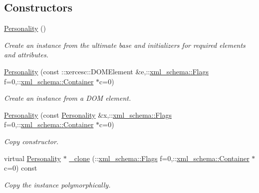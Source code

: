 \subsection*{Constructors}
\begin{DoxyCompactItemize}
\item 
\hypertarget{classopenstack_1_1xml_1_1Personality_af13149098f2110547580283711f33851}{
\hyperlink{classopenstack_1_1xml_1_1Personality_af13149098f2110547580283711f33851}{Personality} ()}
\label{classopenstack_1_1xml_1_1Personality_af13149098f2110547580283711f33851}

\begin{DoxyCompactList}\small\item\em Create an instance from the ultimate base and initializers for required elements and attributes. \item\end{DoxyCompactList}\item 
\hyperlink{classopenstack_1_1xml_1_1Personality_a3d4e14aac1922700707ac9179e1499ef}{Personality} (const ::xercesc::DOMElement \&e,::\hyperlink{namespacexml__schema_affb4c227cbd9aa7453dd1dc5a1401943}{xml\_\-schema::Flags} f=0,::\hyperlink{namespacexml__schema_a333dea2213742aea47a37532dec4ec27}{xml\_\-schema::Container} $\ast$c=0)
\begin{DoxyCompactList}\small\item\em Create an instance from a DOM element. \item\end{DoxyCompactList}\item 
\hyperlink{classopenstack_1_1xml_1_1Personality_abb6ce91131bfe8790f1697c7b08a8193}{Personality} (const \hyperlink{classopenstack_1_1xml_1_1Personality}{Personality} \&x,::\hyperlink{namespacexml__schema_affb4c227cbd9aa7453dd1dc5a1401943}{xml\_\-schema::Flags} f=0,::\hyperlink{namespacexml__schema_a333dea2213742aea47a37532dec4ec27}{xml\_\-schema::Container} $\ast$c=0)
\begin{DoxyCompactList}\small\item\em Copy constructor. \item\end{DoxyCompactList}\item 
virtual \hyperlink{classopenstack_1_1xml_1_1Personality}{Personality} $\ast$ \hyperlink{classopenstack_1_1xml_1_1Personality_abf7c400ce1a37ccb731eb2878e139df9}{\_\-clone} (::\hyperlink{namespacexml__schema_affb4c227cbd9aa7453dd1dc5a1401943}{xml\_\-schema::Flags} f=0,::\hyperlink{namespacexml__schema_a333dea2213742aea47a37532dec4ec27}{xml\_\-schema::Container} $\ast$c=0) const 
\begin{DoxyCompactList}\small\item\em Copy the instance polymorphically. \item\end{DoxyCompactList}\end{DoxyCompactItemize}


